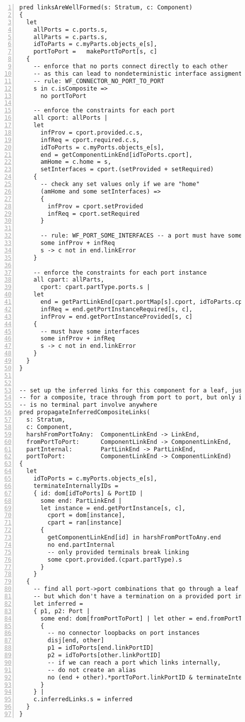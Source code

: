 \begin{lstlisting}[caption={bb\_port\_inference.als}, numbers=left]
pred linksAreWellFormed(s: Stratum, c: Component)
{
  let
    allPorts = c.ports.s,
    allParts = c.parts.s,
    idToParts = c.myParts.objects_e[s],
    portToPort =   makePortToPort[s, c]
  {
    -- enforce that no ports connect directly to each other
    -- as this can lead to nondeterministic interface assigment
    -- rule: WF_CONNECTOR_NO_PORT_TO_PORT
    s in c.isComposite =>
      no portToPort

    -- enforce the constraints for each port
    all cport: allPorts |
    let
      infProv = cport.provided.c.s,
      infReq = cport.required.c.s,
      idToPorts = c.myPorts.objects_e[s],
      end = getComponentLinkEnd[idToPorts.cport],
      amHome = c.home = s,
      setInterfaces = cport.(setProvided + setRequired)
    {
      -- check any set values only if we are "home"
      (amHome and some setInterfaces) =>
      {
        infProv = cport.setProvided
        infReq = cport.setRequired
      }
      
      -- rule: WF_PORT_SOME_INTERFACES -- a port must have some interfaces
      some infProv + infReq
      s -> c not in end.linkError
    }

    -- enforce the constraints for each port instance
    all cpart: allParts,
      cport: cpart.partType.ports.s |
    let
      end = getPartLinkEnd[cpart.portMap[s].cport, idToParts.cpart],
      infReq = end.getPortInstanceRequired[s, c],
      infProv = end.getPortInstanceProvided[s, c]
    {
      -- must have some interfaces
      some infProv + infReq
      s -> c not in end.linkError
    }
  }
}


-- set up the inferred links for this component for a leaf, just use the links
-- for a composite, trace through from port to port, but only infer a link if there
-- is no terminal part involve anywhere
pred propagateInferredCompositeLinks(
  s: Stratum,
  c: Component,  
  harshFromPortToAny:  ComponentLinkEnd -> LinkEnd,
  fromPortToPort:      ComponentLinkEnd -> ComponentLinkEnd,
  partInternal:        PartLinkEnd -> PartLinkEnd,
  portToPort:          ComponentLinkEnd -> ComponentLinkEnd)
{
  let
    idToPorts = c.myPorts.objects_e[s],
    terminateInternallyIDs =
    { id: dom[idToPorts] & PortID |
      some end: PartLinkEnd |
      let instance = end.getPortInstance[s, c],
        cport = dom[instance],
        cpart = ran[instance]
      {
        getComponentLinkEnd[id] in harshFromPortToAny.end
        no end.partInternal
        -- only provided terminals break linking
        some cport.provided.(cpart.partType).s
      }
    }
  {
    -- find all port->port combinations that go through a leaf part and link up
    -- but which don't have a termination on a provided port instance interface
    let inferred =
    { p1, p2: Port |
      some end: dom[fromPortToPort] | let other = end.fromPortToPort
      {
        -- no connector loopbacks on port instances
        disj[end, other]
        p1 = idToPorts[end.linkPortID]
        p2 = idToPorts[other.linkPortID]
        -- if we can reach a port which links internally,
        -- do not create an alias
        no (end + other).*portToPort.linkPortID & terminateInternallyIDs
      }
    } |
    c.inferredLinks.s = inferred
  }
}
\end{lstlisting}
